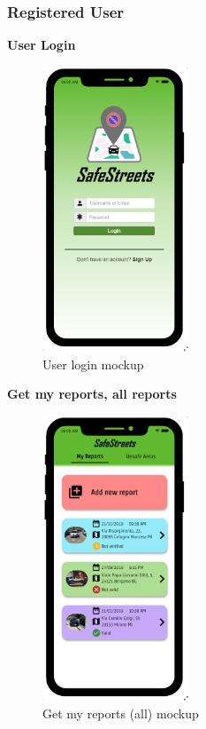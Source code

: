 				\subsubsection{Registered User}
					\begin{center}
						{\small \textbf{User Login}}
					\end{center}
					\vspace{-5mm}
					\begin{figure}[!h]
						\centering
						\includegraphics[height=8.5cm]{images/MockUp/User/UserLogin.pdf}
						\caption{User login mockup}
					\end{figure}
					\vspace{-1mm}
					\begin{center}
						{\small \textbf{Get my reports, all reports}}
					\end{center}
					\vspace{-5mm}
					\begin{figure}[!h]
						\centering
						\includegraphics[height=8.5cm]{images/MockUp/User/MyReports.pdf}
						\caption{Get my reports (all) mockup}
					\end{figure}
